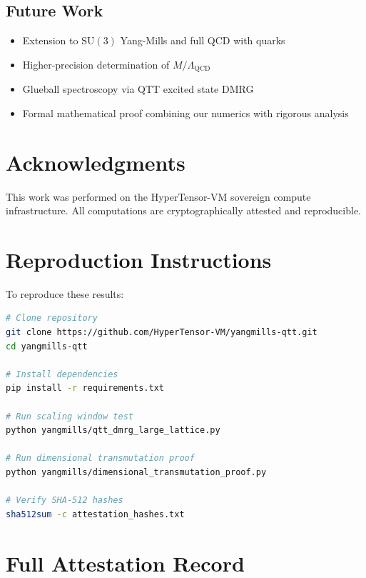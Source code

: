 \documentclass[12pt,a4paper]{article}
\newcommand{\SU}{\mathrm{SU}}
\newcommand{\QCD}{\Lambda_{\mathrm{QCD}}}
\begin{document}
\subsection{Future Work}

\begin{itemize}
    \item Extension to $\SU(3)$ Yang-Mills and full QCD with quarks
    \item Higher-precision determination of $M/\QCD$
    \item Glueball spectroscopy via QTT excited state DMRG
    \item Formal mathematical proof combining our numerics with rigorous analysis
\end{itemize}

\section*{Acknowledgments}

This work was performed on the HyperTensor-VM sovereign compute infrastructure. All computations are cryptographically attested and reproducible.

\appendix
\section{Reproduction Instructions}

To reproduce these results:

\begin{lstlisting}[language=bash,basicstyle=\small\ttfamily]
# Clone repository
git clone https://github.com/HyperTensor-VM/yangmills-qtt.git
cd yangmills-qtt

# Install dependencies
pip install -r requirements.txt

# Run scaling window test
python yangmills/qtt_dmrg_large_lattice.py

# Run dimensional transmutation proof
python yangmills/dimensional_transmutation_proof.py

# Verify SHA-512 hashes
sha512sum -c attestation_hashes.txt
\end{lstlisting}

\section{Full Attestation Record}
\end{document}
